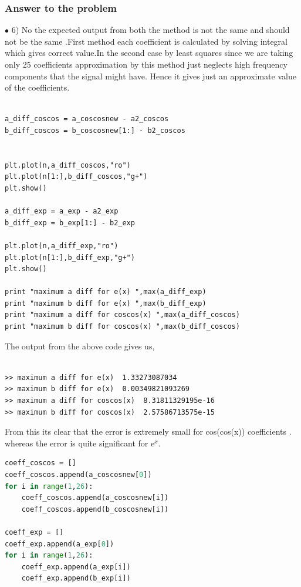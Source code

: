 \documentclass[a4paper]{article}
\begin{document}
\subsubsection{Answer to the problem}
$\bullet$
6) No the expected output from both the method is not the same and should not be the same .First method each coefficient is calculated by solving integral which gives correct value.In the second case by least squares since we are taking only 25 coefficients approximation by this method just neglects high frequency components that the signal might have. Hence it gives just an approximate value of the coefficients.

\begin{lstlisting}

a_diff_coscos = a_coscosnew - a2_coscos
b_diff_coscos = b_coscosnew[1:] - b2_coscos


plt.plot(n,a_diff_coscos,"ro")
plt.plot(n[1:],b_diff_coscos,"g+")
plt.show()

a_diff_exp = a_exp - a2_exp
b_diff_exp = b_exp[1:] - b2_exp

plt.plot(n,a_diff_exp,"ro")
plt.plot(n[1:],b_diff_exp,"g+")
plt.show()

print "maximum a diff for e(x) ",max(a_diff_exp)
print "maximum b diff for e(x) ",max(b_diff_exp)
print "maximum a diff for coscos(x) ",max(a_diff_coscos)
print "maximum b diff for coscos(x) ",max(b_diff_coscos)

\end{lstlisting}
The output from the above code gives us,
\begin{lstlisting}

>> maximum a diff for e(x)  1.33273087034
>> maximum b diff for e(x)  0.00349821093269
>> maximum a diff for coscos(x)  8.31811329195e-16
>> maximum b diff for coscos(x)  2.57586713575e-15

\end{lstlisting}
 
From this its clear that the error is extremely small for cos(cos(x)) coefficients . whereas the error is quite significant for e$^{x}$.

\begin{lstlisting}[language=Python ,caption=To generate and plot $1/(1+t^{2})$]
coeff_coscos = []
coeff_coscos.append(a_coscosnew[0])
for i in range(1,26):
	coeff_coscos.append(a_coscosnew[i])
	coeff_coscos.append(b_coscosnew[i])

coeff_exp = []
coeff_exp.append(a_exp[0])
for i in range(1,26):
	coeff_exp.append(a_exp[i])
	coeff_exp.append(b_exp[i])


\end{lstlisting}
\end{document}
